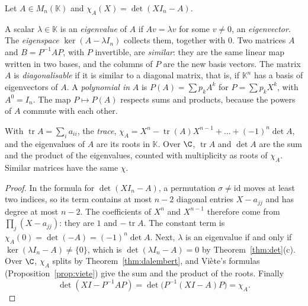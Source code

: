 Let $A\in M_n(\mathbb K)$ and $\chi_A(X)=\det(XI_n-A)$.

\begin{definitionx}
A scalar $\lambda\in\mathbb K$ is an \emph{eigenvalue} of $A$ if $Av=\lambda v$ for some $v\ne0$, an \emph{eigenvector}. The \emph{eigenspace} $\ker(A-\lambda I_n)$ collects them, together with $0$. Two matrices $A$ and $B=P^{-1}AP$, with $P$ invertible, are \emph{similar}: they are the same linear map written in two bases, and the columns of $P$ are the new basis vectors. The matrix $A$ is \emph{diagonalisable} if it is similar to a diagonal matrix, that is, if $\mathbb K^n$ has a basis of eigenvectors of $A$. A \emph{polynomial in} $A$ is $P(A)=\sum p_kA^k$ for $P=\sum p_kX^k$, with $A^0=I_n$. The map $P\mapsto P(A)$ respects sums and products, because the powers of $A$ commute with each other.
\end{definitionx}

\begin{proposition}\label{prop:charpoly}
With $\operatorname{tr}A=\sum_i a_{ii}$, the \emph{trace}, $\chi_A=X^n-\operatorname{tr}(A)X^{n-1}+\dots+(-1)^n\det A$, and the eigenvalues of $A$ are its roots in $\mathbb K$. Over $\C$, $\operatorname{tr}A$ and $\det A$ are the sum and the product of the eigenvalues, counted with multiplicity as roots of $\chi_A$. Similar matrices have the same $\chi$.
\end{proposition}
\begin{proof}
In the formula for $\det(XI_n-A)$, a permutation $\sigma\ne\mathrm{id}$ moves at least two indices, so its term contains at most $n-2$ diagonal entries $X-a_{jj}$ and has degree at most $n-2$. The coefficients of $X^n$ and $X^{n-1}$ therefore come from $\prod_j(X-a_{jj})$: they are $1$ and $-\operatorname{tr}A$. The constant term is $\chi_A(0)=\det(-A)=(-1)^n\det A$. Next, $\lambda$ is an eigenvalue if and only if $\ker(\lambda I_n-A)\ne\{0\}$, which is $\det(\lambda I_n-A)=0$ by Theorem~\ref{thm:det}(c). Over $\C$, $\chi_A$ splits by Theorem~\ref{thm:dalembert}, and Vi\`ete's formulas (Proposition~\ref{prop:viete}) give the sum and the product of the roots. Finally
\[
\det(XI-P^{-1}AP)=\det\bigl(P^{-1}(XI-A)P\bigr)=\chi_A.
\]
\end{proof}

